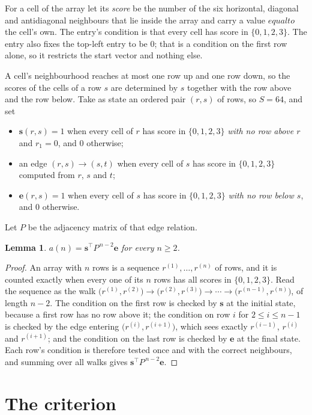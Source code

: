 \documentclass[11pt,a4paper]{article}
\theoremstyle{plain}
\newtheorem{lemma}[theorem]{Lemma}
\theoremstyle{definition}
\begin{document}
For a cell of the array let its \emph{score} be the number of the six horizontal, diagonal and antidiagonal neighbours that lie inside
the array and carry a value $equal to$ the cell's own. The entry's condition is that every cell
has score in $\{0,1,2,3\}$. The entry also fixes the top-left entry to be $0$; that is a condition on the first row alone, so it restricts the start vector and nothing else.

A cell's neighbourhood reaches at most one row up and one row down, so the scores of the
cells of a row $s$ are determined by $s$ together with the row above and the row below.
Take as state an ordered pair $(r,s)$ of rows, so $S=64$, and set
\begin{itemize}
\item $\mathbf{s}(r,s)=1$ when every cell of $r$ has score in $\{0,1,2,3\}$ \emph{with no row
above $r$} and $r_1=0$, and $0$ otherwise;
\item an edge $(r,s)\to(s,t)$ when every cell of $s$ has score in $\{0,1,2,3\}$ computed from
$r$, $s$ and $t$;
\item $\mathbf{e}(r,s)=1$ when every cell of $s$ has score in $\{0,1,2,3\}$ \emph{with no row
below $s$}, and $0$ otherwise.
\end{itemize}
Let $P$ be the adjacency matrix of that edge relation.

\begin{lemma}\label{lem:walk}
$a(n)=\mathbf{s}^{\!\top}P^{\,n-2}\mathbf{e}$ for every $n\ge2$.
\end{lemma}

\begin{proof}
An array with $n$ rows is a sequence $r^{(1)},\dots,r^{(n)}$ of rows, and it is counted
exactly when every one of its $n$ rows has all scores in $\{0,1,2,3\}$. Read the sequence as the
walk $\bigl(r^{(1)},r^{(2)}\bigr)\to\bigl(r^{(2)},r^{(3)}\bigr)\to\cdots\to
\bigl(r^{(n-1)},r^{(n)}\bigr)$, of length $n-2$. The condition on the first row is
checked by $\mathbf{s}$ at the initial state, because a first row has no row above it; the
condition on row $i$ for $2\le i\le n-1$ is checked by the edge entering
$\bigl(r^{(i)},r^{(i+1)}\bigr)$, which sees exactly $r^{(i-1)}$, $r^{(i)}$ and
$r^{(i+1)}$; and the condition on the last row is checked by $\mathbf{e}$ at the final
state. Each row's condition is therefore tested once and with the correct neighbours, and
summing over all walks gives $\mathbf{s}^{\!\top}P^{\,n-2}\mathbf{e}$.
\end{proof}

\section{The criterion}
\end{document}
